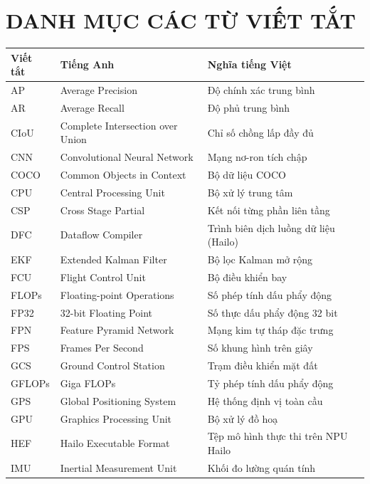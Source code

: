 \chapter*{\centering\large\bfseries DANH MỤC CÁC TỪ VIẾT TẮT}
\begin{singlespace}
\renewcommand{\arraystretch}{1.18}
\begin{longtable}{@{}p{2.8cm}p{6.1cm}p{6.1cm}@{}}
\toprule
\textbf{Viết tắt} & \textbf{Tiếng Anh} & \textbf{Nghĩa tiếng Việt}\\
\midrule\endhead
AP & Average Precision & Độ chính xác trung bình\\
AR & Average Recall & Độ phủ trung bình\\
CIoU & Complete Intersection over Union & Chỉ số chồng lấp đầy đủ\\
CNN & Convolutional Neural Network & Mạng nơ-ron tích chập\\
COCO & Common Objects in Context & Bộ dữ liệu COCO\\
CPU & Central Processing Unit & Bộ xử lý trung tâm\\
CSP & Cross Stage Partial & Kết nối từng phần liên tầng\\
DFC & Dataflow Compiler & Trình biên dịch luồng dữ liệu (Hailo)\\
EKF & Extended Kalman Filter & Bộ lọc Kalman mở rộng\\
FCU & Flight Control Unit & Bộ điều khiển bay\\
FLOPs & Floating-point Operations & Số phép tính dấu phẩy động\\
FP32 & 32-bit Floating Point & Số thực dấu phẩy động 32 bit\\
FPN & Feature Pyramid Network & Mạng kim tự tháp đặc trưng\\
FPS & Frames Per Second & Số khung hình trên giây\\
GCS & Ground Control Station & Trạm điều khiển mặt đất\\
GFLOPs & Giga FLOPs & Tỷ phép tính dấu phẩy động\\
GPS & Global Positioning System & Hệ thống định vị toàn cầu\\
GPU & Graphics Processing Unit & Bộ xử lý đồ hoạ\\
HEF & Hailo Executable Format & Tệp mô hình thực thi trên NPU Hailo\\
IMU & Inertial Measurement Unit & Khối đo lường quán tính\\

\end{longtable}
\end{singlespace}

